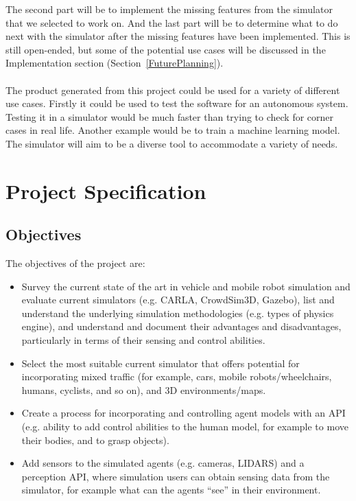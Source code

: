 The second part will be to implement the missing features from the simulator that we selected to work on.
And the last part will be to determine what to do next with the simulator after the missing features have been implemented. This is still open-ended, but some of the potential use cases will be discussed in the Implementation section (Section~\ref{FuturePlanning}).
\\~\\ 
The product generated from this project could be used for a variety of different use cases. Firstly it could be used to test the software for an autonomous system. Testing it in a simulator would be much faster than trying to check for corner cases in real life. Another example would be to train a machine learning model. The simulator will aim to be a diverse tool to accommodate a variety of needs. 

\section{Project Specification} \label{ProjectSpec}
\subsection{Objectives} \label{Objectives}
The objectives of the project are: 
\begin{itemize}
    \item Survey the current state of the art in vehicle and mobile robot simulation and evaluate current simulators (e.g. CARLA, CrowdSim3D, Gazebo), list and understand the underlying simulation methodologies (e.g. types of physics engine), and understand and document their advantages and disadvantages, particularly in terms of their sensing and control abilities.
    \item Select the most suitable current simulator that offers potential for incorporating mixed traffic (for example, cars, mobile robots/wheelchairs, humans, cyclists, and so on), and 3D environments/maps.
    \item Create a process for incorporating and controlling agent models with an API (e.g. ability to add control abilities to the human model, for example to move their bodies, and to grasp objects).
    \item Add sensors to the simulated agents (e.g. cameras, LIDARS) and a perception API, where simulation users can obtain sensing data from the simulator, for example what can the agents “see” in their environment.
\end{itemize}


